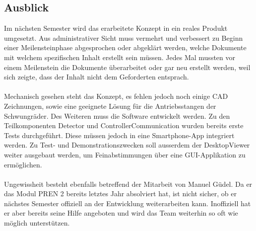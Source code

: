 \subsection{Ausblick}
Im nächsten Semester wird das erarbeitete Konzept in ein reales Produkt umgesetzt. Aus administrativer Sicht muss vermehrt und verbessert zu Beginn einer Meilensteinphase abgesprochen oder abgeklärt werden, welche Dokumente mit welchem spezifischen Inhalt erstellt sein müssen. Jedes Mal mussten vor einem Meilenstein die Dokumente überarbeitet oder gar neu erstellt werden, weil sich zeigte, dass der Inhalt nicht dem Geforderten entsprach.\\
\\
Mechanisch gesehen steht das Konzept, es fehlen jedoch noch einige CAD Zeichnungen, sowie eine geeignete Lösung für die Antriebsstangen der Schwungräder. Des Weiteren muss die Software entwickelt werden. Zu den Teilkomponenten Detector und ControllerCommunication wurden bereits erste Tests durchgeführt. Diese müssen jedoch in eine Smartphone-App integriert werden. Zu Test- und Demonstrationszwecken soll ausserdem der DesktopViewer weiter ausgebaut werden, um Feinabstimmungen über eine GUI-Applikation zu ermöglichen.\\
\\
Ungewissheit besteht ebenfalls betreffend der Mitarbeit von Manuel Güdel. Da er das Modul PREN 2 bereits letztes Jahr absolviert hat, ist nicht sicher, ob er nächstes Semester offiziell an der Entwicklung weiterarbeiten kann. Inoffiziell hat er aber bereits seine Hilfe angeboten und wird das Team weiterhin so oft wie möglich unterstützen.
